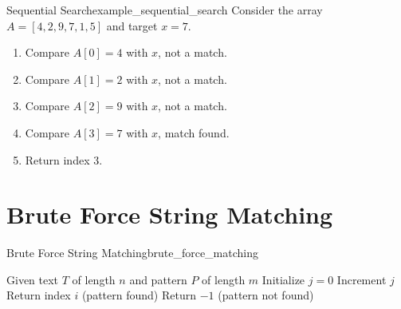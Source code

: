 \begin{exampletcb}
    {Sequential Search}{example_sequential_search}
    Consider the array $A = [4, 2, 9, 7, 1, 5]$ and target $x = 7$.

    \begin{enumerate}
        \item Compare $A[0] = 4$ with $x$, not a match.
        \item Compare $A[1] = 2$ with $x$, not a match.
        \item Compare $A[2] = 9$ with $x$, not a match.
        \item Compare $A[3] = 7$ with $x$, match found.
        \item Return index $3$.
    \end{enumerate}
\end{exampletcb}


\section{Brute Force String Matching}
\begin{algorithmtcb}
    {Brute Force String Matching}{brute_force_matching}
    \begin{algorithmic}
        \State{} Given text $T$ of length $n$ and pattern $P$ of length $m$
          
            \State{} Initialize $j = 0$
                \State{} Increment $j$
            \EndWhile{}
                \State{} Return index $i$ (pattern found)
            \EndIf{}
        \EndFor{}
        \State{} Return $-1$ (pattern not found)
    \end{algorithmic}
\end{algorithmtcb}

